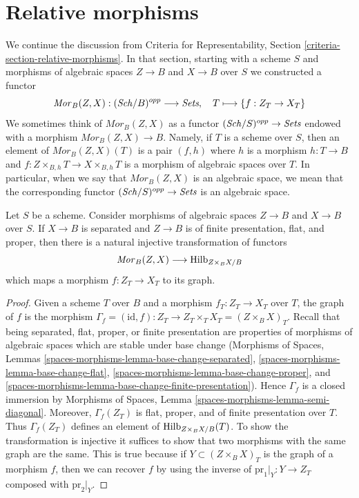\section{Relative morphisms}
\label{section-relative-morphisms}

\noindent
We continue the discussion from Criteria for Representability, Section
\ref{criteria-section-relative-morphisms}.
In that section, starting with a scheme $S$ and morphisms
of algebraic spaces $Z \to B$ and $X \to B$ over $S$
we constructed a functor
$$
\mathit{Mor}_B(Z, X) : (\mathit{Sch}/B)^{opp} \longrightarrow \textit{Sets}, \quad
T \longmapsto \{f : Z_T \to X_T\}
$$
We sometimes think of $\mathit{Mor}_B(Z, X)$
as a functor $(\mathit{Sch}/S)^{opp} \to \textit{Sets}$ endowed with a morphism
$\mathit{Mor}_B(Z, X) \to B$.
Namely, if $T$ is a scheme over $S$, then an element
of $\mathit{Mor}_B(Z, X)(T)$ is a pair $(f, h)$
where $h$ is a morphism $h : T \to B$
and $f : Z \times_{B, h} T \to X \times_{B, h} T$
is a morphism of algebraic spaces over $T$. In particular, when we say
that $\mathit{Mor}_B(Z, X)$ is an algebraic space, we mean that the
corresponding functor $(\mathit{Sch}/S)^{opp} \to \textit{Sets}$ is an algebraic space.

\begin{lemma}
\label{lemma-Mor-into-Hilb}
Let $S$ be a scheme. Consider morphisms
of algebraic spaces $Z \to B$ and $X \to B$ over $S$.
If $X \to B$ is separated and $Z \to B$ is
of finite presentation, flat, and proper,
then there is a natural
injective transformation of functors
$$
\mathit{Mor}_B(Z, X) \longrightarrow \mathrm{Hilb}_{Z \times_B X/B}
$$
which maps a morphism $f : Z_T \to X_T$ to its graph.
\end{lemma}

\begin{proof}
Given a scheme $T$ over $B$ and a morphism $f_T : Z_T \to X_T$
over $T$, the graph of $f$ is the morphism
$\Gamma_f = (\text{id}, f) : Z_T \to Z_T \times_T X_T = (Z \times_B X)_T$.
Recall that being separated, flat, proper, or finite presentation
are properties of morphisms of algebraic spaces which are stable
under base change (Morphisms of Spaces, Lemmas
\ref{spaces-morphisms-lemma-base-change-separated},
\ref{spaces-morphisms-lemma-base-change-flat},
\ref{spaces-morphisms-lemma-base-change-proper}, and
\ref{spaces-morphisms-lemma-base-change-finite-presentation}).
Hence $\Gamma_f$ is a closed immersion by
Morphisms of Spaces, Lemma \ref{spaces-morphisms-lemma-semi-diagonal}.
Moreover, $\Gamma_f(Z_T)$ is flat, proper, and of finite presentation over $T$.
Thus $\Gamma_f(Z_T)$ defines an element of $\mathrm{Hilb}_{Z \times_B X/B}(T)$.
To show the transformation is injective it suffices to show that
two morphisms with the same graph are the same. This is true because
if $Y \subset (Z \times_B X)_T$ is the graph of a morphism $f$, then
we can recover $f$ by using the inverse of $\text{pr}_1|_Y : Y \to Z_T$
composed with $\text{pr}_2|_Y$.
\end{proof}

